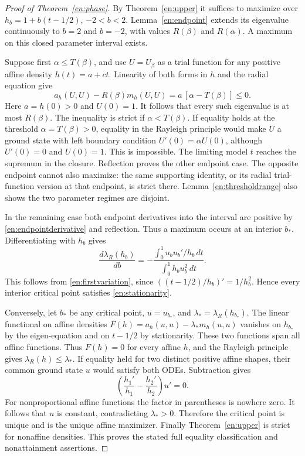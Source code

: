 \documentclass[12pt]{amsart}
\theoremstyle{definition}
\theoremstyle{remark}
\numberwithin{equation}{section}
\begin{document}
\begin{proof}[Proof of Theorem~\ref{en:phase}]
By Theorem~\ref{en:upper} it suffices to maximize over $h_b=1+b(t-1/2)$, $-2<b<2$. Lemma~\ref{en:endpoint} extends its eigenvalue continuously to $b=2$ and $b=-2$, with values $R(\beta)$ and $R(\alpha)$. A maximum on this closed parameter interval exists.

Suppose first $\alpha\le T(\beta)$, and use $U=U_\beta$ as a trial function for any positive affine density $h(t)=a+ct$. Linearity of both forms in $h$ and the radial equation give
\begin{equation}\label{en:support}
 a_h(U,U)-R(\beta)m_h(U,U)=a\,[\alpha-T(\beta)]\le0.
\end{equation}
Here $a=h(0)>0$ and $U(0)=1$. It follows that every such eigenvalue is at most $R(\beta)$. The inequality is strict if $\alpha<T(\beta)$. If equality holds at the threshold $\alpha=T(\beta)>0$, equality in the Rayleigh principle would make $U$ a ground state with left boundary condition $U'(0)=\alpha U(0)$, although $U'(0)=0$ and $U(0)=1$. This is impossible. The limiting model $t$ reaches the supremum in the closure. Reflection proves the other endpoint case. The opposite endpoint cannot also maximize: the same supporting identity, or its radial trial-function version at that endpoint, is strict there. Lemma~\ref{en:thresholdrange} also shows the two parameter regimes are disjoint.

In the remaining case both endpoint derivatives into the interval are positive by \eqref{en:endpointderivative} and reflection. Thus a maximum occurs at an interior $b_*$. Differentiating with $h_b$ gives
\begin{equation}\label{en:affinevariation}
 \frac{d\lambda_R(h_b)}{db}
 =-\frac{\int_0^1u_bu_b'/h_b\,dt}{\int_0^1h_bu_b^2\,dt}.
\end{equation}
This follows from \eqref{en:firstvariation}, since
$((t-1/2)/h_b)'=1/h_b^2$. Hence every interior critical point satisfies \eqref{en:stationarity}.

Conversely, let $b_*$ be any critical point, $u=u_{b_*}$, and $\lambda_* =\lambda_R(h_{b_*})$. The linear functional on affine densities
$F(h)=a_h(u,u)-\lambda_*m_h(u,u)$ vanishes on $h_{b_*}$ by the eigen-equation and on $t-1/2$ by stationarity. These two functions span all affine functions. Thus $F(h)=0$ for every affine $h$, and the Rayleigh principle gives $\lambda_R(h)\le\lambda_*$.
If equality held for two distinct positive affine shapes, their common ground state $u$ would satisfy both ODEs. Subtraction gives
\[
 \left(\frac{h_1'}{h_1}-\frac{h_2'}{h_2}\right)u'=0.
\]
For nonproportional affine functions the factor in parentheses is nowhere zero. It follows that $u$ is constant, contradicting $\lambda_*>0$. Therefore the critical point is unique and is the unique affine maximizer. Finally Theorem~\ref{en:upper} is strict for nonaffine densities. This proves the stated full equality classification and nonattainment assertions.
\end{proof}
\end{document}
